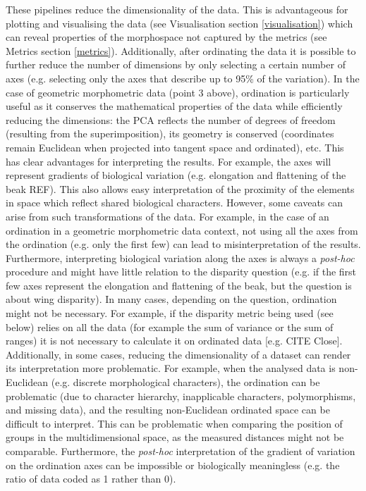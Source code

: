 \documentclass[12pt,letterpaper]{article}
\begin{document}
These pipelines reduce the dimensionality of the data.
This is advantageous for plotting and visualising the data (see Visualisation section \ref{visualisation}) which can reveal properties of the morphospace not captured by the metrics (see Metrics section \ref{metrics}).
Additionally, after ordinating the data it is possible to further reduce the number of dimensions by only selecting a certain number of axes (e.g. selecting only the axes that describe up to 95\% of the variation).
In the case of geometric morphometric data (point 3 above), ordination is particularly useful as it conserves the mathematical properties of the data while efficiently reducing the dimensions: the PCA reflects the number of degrees of freedom (resulting from the superimposition), its geometry is conserved (coordinates remain Euclidean when projected into tangent space and ordinated), etc. %
This has clear advantages for interpreting the results.
For example, the axes will represent gradients of biological variation (e.g. elongation and flattening of the beak REF).
This also allows easy interpretation of the proximity of the elements in space which reflect shared biological characters.
However, some caveats can arise from such transformations of the data.
For example, in the case of an ordination in a geometric morphometric data context, not using all the axes from the ordination (e.g. only the first few) can lead to misinterpretation of the results.
Furthermore, interpreting biological variation along the axes is always a \textit{post-hoc} procedure and might have little relation to the disparity question (e.g. if the first few axes represent the elongation and flattening of the beak, but the question is about wing disparity).
In many cases, depending on the question, ordination might not be necessary.
For example, if the disparity metric being used (see below) relies on all the data (for example the sum of variance or the sum of ranges) it is not necessary to calculate it on ordinated data [e.g. CITE Close].
Additionally, in some cases, reducing the dimensionality of a dataset can render its interpretation more problematic.
For example, when the analysed data is non-Euclidean (e.g. discrete morphological characters), the ordination can be problematic (due to character hierarchy, inapplicable characters, polymorphisms, and missing data), and the resulting non-Euclidean ordinated space can be difficult to interpret.
This can be problematic when comparing the position of groups in the multidimensional space, as the measured distances might not be comparable.
Furthermore, the \textit{post-hoc} interpretation of the gradient of variation on the ordination axes can be impossible or biologically meaningless (e.g. the ratio of data coded as 1 rather than 0). %
\end{document}
